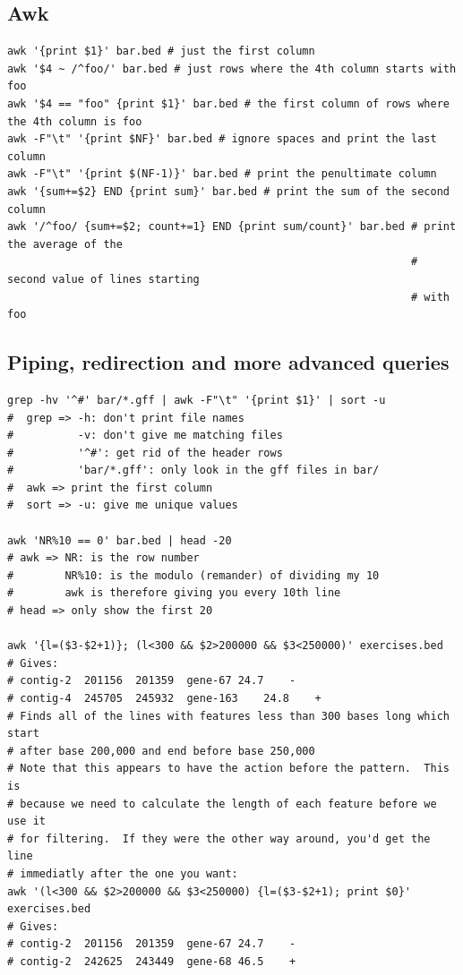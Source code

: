 \documentclass[11pt]{article}
\begin{document}
\hypertarget{awk}{%
\subsection{Awk}\label{awk}}

\begin{verbatim}
awk '{print $1}' bar.bed # just the first column
awk '$4 ~ /^foo/' bar.bed # just rows where the 4th column starts with foo
awk '$4 == "foo" {print $1}' bar.bed # the first column of rows where the 4th column is foo
awk -F"\t" '{print $NF}' bar.bed # ignore spaces and print the last column
awk -F"\t" '{print $(NF-1)}' bar.bed # print the penultimate column
awk '{sum+=$2} END {print sum}' bar.bed # print the sum of the second column
awk '/^foo/ {sum+=$2; count+=1} END {print sum/count}' bar.bed # print the average of the
                                                               # second value of lines starting
                                                               # with foo
\end{verbatim}

\hypertarget{piping-redirection-and-more-advanced-queries}{%
\subsection{Piping, redirection and more advanced
queries}\label{piping-redirection-and-more-advanced-queries}}

\begin{verbatim}
grep -hv '^#' bar/*.gff | awk -F"\t" '{print $1}' | sort -u
#  grep => -h: don't print file names
#          -v: don't give me matching files
#          '^#': get rid of the header rows
#          'bar/*.gff': only look in the gff files in bar/
#  awk => print the first column
#  sort => -u: give me unique values

awk 'NR%10 == 0' bar.bed | head -20
# awk => NR: is the row number
#        NR%10: is the modulo (remander) of dividing my 10
#        awk is therefore giving you every 10th line
# head => only show the first 20

awk '{l=($3-$2+1)}; (l<300 && $2>200000 && $3<250000)' exercises.bed
# Gives:
# contig-2  201156  201359  gene-67 24.7    -
# contig-4  245705  245932  gene-163    24.8    +
# Finds all of the lines with features less than 300 bases long which start
# after base 200,000 and end before base 250,000
# Note that this appears to have the action before the pattern.  This is
# because we need to calculate the length of each feature before we use it
# for filtering.  If they were the other way around, you'd get the line
# immediatly after the one you want:
awk '(l<300 && $2>200000 && $3<250000) {l=($3-$2+1); print $0}' exercises.bed
# Gives:
# contig-2  201156  201359  gene-67 24.7    -
# contig-2  242625  243449  gene-68 46.5    +
\end{verbatim}
\end{document}
